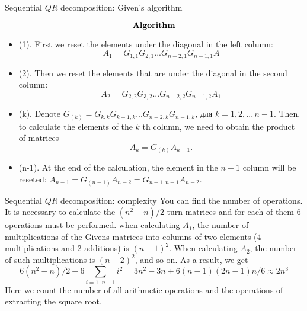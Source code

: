 \documentclass[pdf]{beamer}
\begin{document}
\begin{frame}{Sequential $ QR $ decomposition: Given's algorithm}
  
  
 $$\bf\textbf{  Algorithm }$$ 

\begin{itemize} 

\item
 (1).  
First we reset the elements under the diagonal in the left column:
 $$ A_{1}=G_{1,1}G_{2,1}... G_{n-2,1}G_{n-1,1}A$$

  \item
 (2).  
Then we reset the elements that are under the diagonal in the second column:
 $$ A_{2}=G_{2,2}G_{3,2}... G_{n-2,2}G_{n-1,2}A_{1}$$
 \item
 (k).   Denote $G_{(k)}= G_{k,k}G_{k-1,k}... G_{n-2,k}G_{n-1,k} $, для $k=1,2,..,n-1$.  
 Then, to calculate the elements of the $ k $ th column, we need to obtain the product of matrices
%
  $$ A_k=G_{(k)} A_{k-1}.$$
%
\item (n-1).  
At the end of the calculation, the element in the $ n-1 $ column will be reseted: $A_{n-1}=G_{(n-1)}A_{n-2}=G_{n-1,n-1} A_{n-2}.$ 
\end{itemize}  
  

  \end{frame}


\begin{frame}{Sequential $ QR $ decomposition: complexity}
  You can find the number of operations. It is necessary to calculate the $ (n ^ 2-n) / 2 $ turn matrices and for each of them 6 operations must be performed. when calculating $ A_ {1} $, the number of multiplications of the Givens matrices into columns of two elements (4 multiplications and 2 additions) is $ (n-1) ^ 2 $. When calculating $ A_ {2} $, the number of such multiplications is $ ( n-2) ^ 2 $, and so on. As a result, we get
 $$6 (n^2-n)/2+ 6\sum_{i=1..n-1} i^2 = 3 n^2-3n+  6(n-1)(2n-1)n/6\approx 2n^3$$
%
Here we count the number of all arithmetic operations and the operations of extracting the square root.

%  

 
\end{frame}
\end{document}
